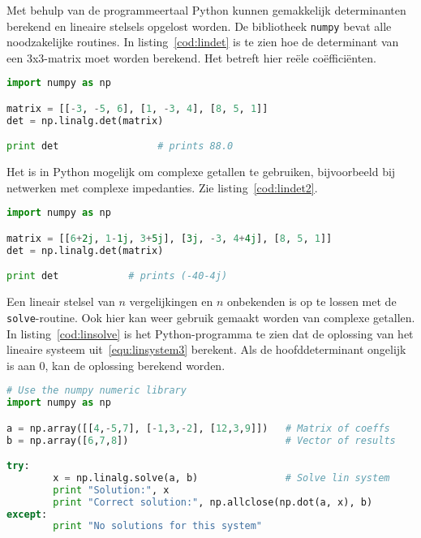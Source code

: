 Met behulp van de programmeertaal Python kunnen gemakkelijk determinanten berekend en lineaire stelsels opgelost worden. De bibliotheek \lstinline|numpy| bevat alle noodzakelijke routines. In listing~\ref{cod:lindet} is te zien hoe de determinant van een 3x3-matrix moet worden berekend. Het betreft hier reële coëfficiënten.
%
\begin{lstlisting}[language=Python,caption=Berekenen van de determinant van een 3x3-matrix.,label=cod:lindet]
import numpy as np

matrix = [[-3, -5, 6], [1, -3, 4], [8, 5, 1]]
det = np.linalg.det(matrix)

print det                 # prints 88.0
\end{lstlisting}

Het is in Python mogelijk om complexe getallen te gebruiken, bijvoorbeeld bij netwerken met complexe impedanties. Zie listing~\ref{cod:lindet2}.
%
\begin{lstlisting}[language=Python,caption=Berekenen van de determinant van een 3x3-matrix met complexe getallen.,label=cod:lindet2]
import numpy as np

matrix = [[6+2j, 1-1j, 3+5j], [3j, -3, 4+4j], [8, 5, 1]]
det = np.linalg.det(matrix)

print det            # prints (-40-4j)
\end{lstlisting}

Een lineair stelsel van $n$ vergelijkingen en $n$ onbekenden is op te lossen met de \lstinline|solve|-routine. Ook hier kan weer gebruik gemaakt worden van complexe getallen. In listing~\ref{cod:linsolve} is het Python-programma te zien dat de oplossing van het lineaire systeem uit~\eqref{equ:linsystem3} berekent. Als de hoofddeterminant ongelijk is aan 0, kan de oplossing berekend worden.
%
\begin{lstlisting}[language=Python,caption=Berekenen van de oplossing van een lineair systeem met drie vergelijkingen.,label=cod:linsolve]
# Use the numpy numeric library
import numpy as np

a = np.array([[4,-5,7], [-1,3,-2], [12,3,9]])   # Matrix of coeffs
b = np.array([6,7,8])                           # Vector of results

try:
        x = np.linalg.solve(a, b)               # Solve lin system
        print "Solution:", x
        print "Correct solution:", np.allclose(np.dot(a, x), b)
except:
        print "No solutions for this system"
\end{lstlisting}